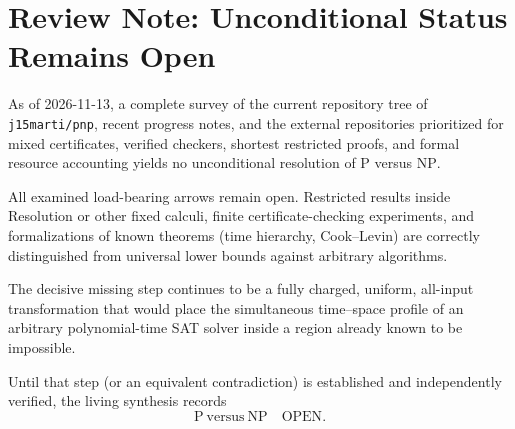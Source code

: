 
\section*{Review Note: Unconditional Status Remains Open}
\label{sec:grok-2026-11-13}

As of 2026-11-13, a complete survey of the current repository tree of \texttt{j15marti/pnp}, recent progress notes, and the external repositories prioritized for mixed certificates, verified checkers, shortest restricted proofs, and formal resource accounting yields no unconditional resolution of \(\mathrm{P}\) versus \(\mathrm{NP}\).

All examined load-bearing arrows remain open. Restricted results inside Resolution or other fixed calculi, finite certificate-checking experiments, and formalizations of known theorems (time hierarchy, Cook--Levin) are correctly distinguished from universal lower bounds against arbitrary algorithms.

The decisive missing step continues to be a fully charged, uniform, all-input transformation that would place the simultaneous time--space profile of an arbitrary polynomial-time SAT solver inside a region already known to be impossible.

Until that step (or an equivalent contradiction) is established and independently verified, the living synthesis records
\[
\mathrm{P}\ \text{versus}\ \mathrm{NP}\quad\text{OPEN}.
\]
